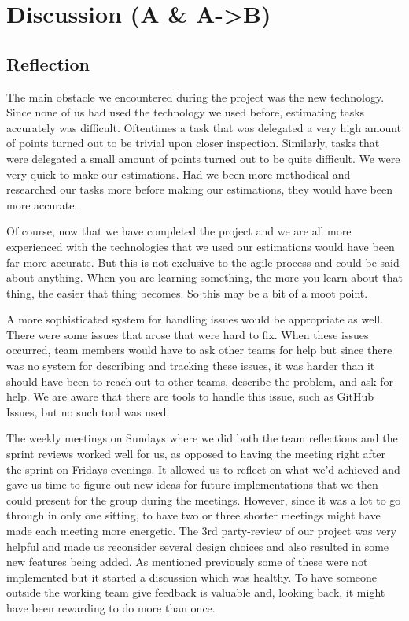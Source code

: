 \section{Discussion (A \& A->B)}
\subsection{Reflection}
The main obstacle we encountered during the project was the new technology. Since none of us had used the technology we used before, estimating tasks accurately was difficult. Oftentimes a task that was delegated a very high amount of points turned out to be trivial upon closer inspection. Similarly, tasks that were delegated a small amount of points turned out to be quite difficult. We were very quick to make our estimations. Had we been more methodical and researched our tasks more before making our estimations, they would have been more accurate. 

Of course, now that we have completed the project and we are all more experienced with the technologies that we used our estimations would have been far more accurate. But this is not exclusive to the agile process and could be said about anything. When you are learning something, the more you learn about that thing, the easier that thing becomes. So this may be a bit of a moot point. 

A more sophisticated system for handling issues would be appropriate as well. There were some issues that arose that were hard to fix. When these issues occurred, team members would have to ask other teams for help but since there was no system for describing and tracking these issues, it was harder than it should have been to reach out to other teams, describe the problem, and ask for help. We are aware that there are tools to handle this issue, such as GitHub Issues, but no such tool was used. 

The weekly meetings on Sundays where we did both the team reflections and the sprint reviews worked well for us, as opposed to having the meeting right after the sprint on Fridays evenings. It allowed us to reflect on what we’d achieved and gave us time to figure out new ideas for future implementations that we then could present for the group during the meetings. However, since it was a lot to go through in only one sitting, to have two or three shorter meetings might have made each meeting more energetic. The 3rd party-review of our project was very helpful and made us reconsider several design choices and also resulted in some new features being added. As mentioned previously some of these were not implemented but it started a discussion which was healthy. To have someone outside the working team give feedback is valuable and, looking back, it might have been rewarding to do more than once.

